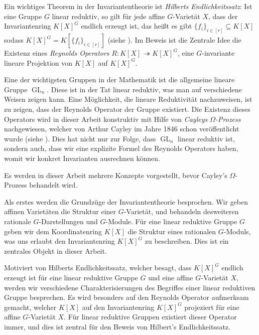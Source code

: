 Ein wichtiges Theorem in der Invariantentheorie ist \textit{Hilberts Endlichkeitssatz}:  Ist eine Gruppe $G$ linear reduktiv, so gilt f\"ur jede affine $G$-Variet\"at $X$, dass der Invariantenring $K[X]^G$ endlich erzeugt ist, das hei{\ss}t es gibt $\{f_i\}_{i\in[r]} \subseteq K[X]$ sodass $K[X]^G = K[\{f_i\}_{i\in[r]}]$ (siehe \cite{Hil90}).
Im Beweis ist die Zentrale Idee die Existenz eines \textit{Reynolds Operators} $R \colon K[X] \twoheadrightarrow K[X]^G$, eine $G$-invariante lineare Projektion von $K[X]$ auf $K[X]^G$.

Eine der wichtigsten Gruppen in der Mathematik ist die allgemeine lineare Gruppe $\operatorname{GL}_n$.
Diese ist in der Tat linear reduktiv, was man auf verschiedene Weisen zeigen kann.
Eine M\"oglichkeit, die lineare Reduktivit\"at nachzuweisen, ist zu zeigen, dass der Reynolds Operator der Gruppe existiert.
Die Existenz dieses Operators wird in dieser Arbeit konstruktiv mit Hilfe von \textit{Cayleys $\Omega$-Prozess} nachgewiesen, welcher von Arthur Cayley im Jahre 1846 schon ver\"offentlicht wurde (siehe \cite{Cay46}).
Dies hat nicht nur zur Folge, dass $\operatorname{GL}_n$ linear reduktiv ist, sondern auch, dass wir eine explizite Formel des Reynolds Operators haben, womit wir konkret Invarianten ausrechnen k\"onnen.

Es werden in dieser Arbeit mehrere Konzepte vorgestellt, bevor Cayley's $\Omega$-Prozess behandelt wird.

Als erstes werden die Grundz\"uge der Invariantentheorie besprochen.
Wir geben affinen Variet\"aten die Struktur einer $G$-Variet\"at, und behandeln \linebreak desweiteren rationale $G$-Darstellungen und $G$-Module.
F\"ur eine linear reduktive Gruppe $G$ geben wir dem Koordinatenring $K[X]$ die Struktur eines rationalen $G$-Moduls, was uns erlaubt den Invariantenring $K[X]^G$ zu beschreiben.
Dies ist ein zentrales Objekt in dieser Arbeit.

Motiviert von Hilberts Endlichkeitssatz, welcher besagt, dass $K[X]^G$ endlich erzeugt ist f\"ur eine linear reduktive Gruppe $G$ und eine affine $G$-Variet\"at $X$, werden wir verschiedene Charakterisierungen des Begriffes einer linear reduktiven Gruppe besprechen.
Es wird besonders auf den Reynolds Operator aufmerksam gemacht, welcher $K[X]$ auf den Invariantenring $K[X]^G$ projeziert f\"ur eine affine $G$-Variet\"at $X$.
F\"ur linear reduktive Gruppen existiert dieser Operator immer, und dies ist zentral f\"ur den Beweis von Hilbert's Endlichkeitssatz.

